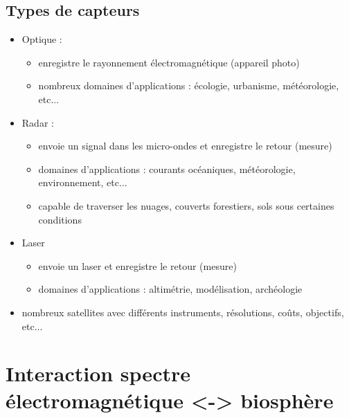 \documentclass[11pt]{beamer}
\begin{document}
\subsection{Types de capteurs}
\begin{frame}{}
\begin{itemize}
\item Optique : 
\begin{itemize}
\item enregistre le rayonnement électromagnétique (appareil photo)
\item nombreux domaines d'applications : écologie, urbanisme, météorologie, etc...
\end{itemize} 
\item Radar :
\begin{itemize}
\item envoie un signal dans les micro-ondes et enregistre le retour (mesure)
\item domaines d'applications : courants océaniques, météorologie, environnement, etc...
\item capable de traverser les nuages, couverts forestiers, sols sous certaines conditions
\end{itemize} 
\item Laser
\begin{itemize}
\item envoie un laser et enregistre le retour (mesure)
\item domaines d'applications : altimétrie, modélisation, archéologie
\end{itemize} 
\item nombreux satellites avec différents instruments, résolutions, coûts, objectifs, etc...
\end{itemize}
\end{frame}

\section{Interaction spectre électromagnétique <-> biosphère}
\end{document}
